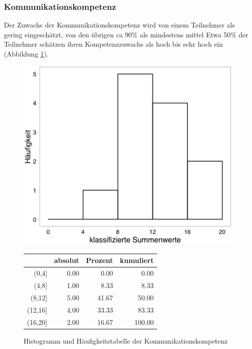 \documentclass[12pt,smallheadings, bibliography=totoc]{scrartcl}
\begin{document}
\subsubsection{Kommunikationskompetenz}\label{kommunikationskompetenz}

Der Zuwachs der Kommunikationskompetenz wird von einem Teilnehmer als
gering eingeschätzt, von den übrigen ca 90\% als mindestens mittel Etwa
50\% der Teilnehmer schätzen ihren Kompetenzzuwachs als hoch bis sehr
hoch ein (Abbildung \ref{fig:KK}).

\begin{figure}[H]
\begin{minipage}{.4\linewidth}
\includegraphics[width=0.8\linewidth]{Anhang/KKHistnn.png}

\label{pic:aufbau}
\end{minipage}
\begin{minipage}{.4\linewidth}
\centering
\raisebox{\depth}
{\begin{tabular}{rrrr}
  \hline
 & absolut & Prozent & kumuliert \\
  \hline
(0,4] & 0.00 & 0.00 & 0.00 \\
  (4,8] & 1.00 & 8.33 & 8.33 \\
  (8,12] & 5.00 & 41.67 & 50.00 \\
  (12,16] & 4.00 & 33.33 & 83.33 \\
  (16,20] & 2.00 & 16.67 & 100.00 \\
   \hline
\end{tabular}

}
\label{tab:defis}
\end{minipage}
\caption{Histogramm und Häufigkeitstabelle der Kommunikationskompetenz}
\label{fig:KK}
\end{figure}
\end{document}
